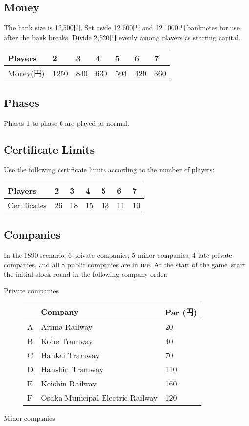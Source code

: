 \documentclass{article}
\begin{document}
\begin{CJK}{UTF8}{min}
\begin{multicols}{2}
\subsection{Money}
The bank size is 12,500円. Set aside 12 500円 and 12 1000円
banknotes for use after the bank breaks. Divide 2,520円 evenly
among players as starting capital.

\begin{tabular}{l|llllll}
Players & 2 & 3 & 4 & 5 & 6 & 7 \\ \hline
Money(円) & 1250 & 840 & 630 & 504 & 420 & 360
\end{tabular}

\subsection{Phases}

Phases 1 to phase 6 are played as normal.

\subsection{Certificate Limits}
Use the following certificate limits according to the number of players:

\begin{tabular}{l|llllll}
Players & 2 & 3 & 4 & 5 & 6 & 7\\
\hline
Certificates & 26 & 18 & 15 & 13 & 11 & 10 \\
\end{tabular}

\subsection{Companies}

In the 1890 scenario, 6 private companies, 5 minor companies, 4 late
private companies, and all 8 public companies are in use. At the start
of the game, start the initial stock round in the following company
order:

\begin{description}
\item[Private companies] \hfill

\begin{tabular}{lp{3cm}l}
 & Company & Par (円) \\
\hline
A & Arima Railway & 20\\
B & Kobe Tramway & 40\\
C & Hankai Tramway & 70 \\
D & Hanshin Tramway & 110\\
E & Keishin Railway & 160\\
F & Osaka Municipal Electric Railway & 120
\end{tabular}
\item[Minor companies] \hfill


\end{description}
\end{multicols}
\end{CJK}
\end{document}
